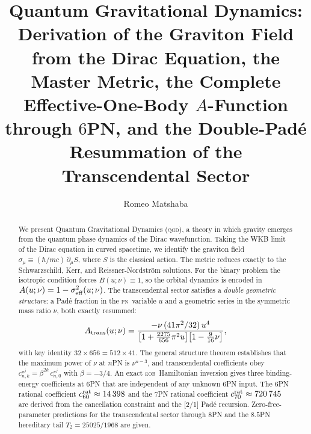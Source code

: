 \documentclass[twocolumn,aps,prd,showpacs,superscriptaddress,floatfix]{revtex4-2}
\newcommand{\sigeq}{\sigma_{\rm eff}^2}
\newcommand{\pn}[1]{$#1$PN}
\newcommand{\QGD}{\textsc{qgd}}
\newcommand{\EOB}{\textsc{eob}}
\newcommand{\PN}{\textsc{pn}}
\begin{document}
\title{Quantum Gravitational Dynamics: Derivation of the Graviton Field
from the Dirac Equation, the Master Metric, the Complete
Effective-One-Body $A$-Function through \pn{6},
and the Double-Pad\'e Resummation of the Transcendental Sector}

\author{Romeo Matshaba}

\begin{abstract}
We present Quantum Gravitational Dynamics (\QGD), a theory in which
gravity emerges from the quantum phase dynamics of the Dirac wavefunction.
Taking the WKB limit of the Dirac equation in curved spacetime, we
identify the graviton field $\sigma_\mu \equiv (\hbar/mc)\,\partial_\mu S$,
where $S$ is the classical action.
The metric reduces exactly to the Schwarzschild, Kerr,
and Reissner-Nordstr\"om solutions.
For the binary problem the isotropic condition forces
$B(u;\nu)\equiv 1$, so the orbital dynamics is encoded in
$A(u;\nu)=1-\sigeq(u;\nu)$.
The transcendental sector satisfies a \emph{double geometric structure}:
a Pad\'e fraction in the \PN\ variable $u$ and a geometric series in
the symmetric mass ratio $\nu$, both exactly resummed:
\begin{equation*}
  A_{\rm trans}(u;\nu) =
    \frac{-\nu\,(41\pi^2/32)\,u^4}
         {\bigl[1+\tfrac{2275}{656}\pi^2 u\bigr]
          \bigl[1-\tfrac{9}{16}\nu\bigr]},
\end{equation*}
with key identity $32\times656=512\times41$.
The general structure theorem establishes that the maximum power of $\nu$
at $n$PN is $\nu^{n-3}$, and transcendental coefficients obey
$c_{n,k}^{\pi^j}=\beta^{2k}\,c_{n,0}^{\pi^j}$ with $\beta=-3/4$.
An exact \EOB\ Hamiltonian inversion gives three binding-energy
coefficients at \pn{6} that are independent of any unknown 6PN input.
The 6PN rational coefficient $c_{60}^{\rm rat}\approx14\,398$ and
the 7PN rational coefficient $c_{70}^{\rm rat}\approx720\,745$ are
derived from the cancellation constraint and the [2/1] Pad\'e recursion.
Zero-free-parameter predictions for the transcendental sector through
\pn{8} and the \pn{8.5} hereditary tail $T_2=25025/1968$ are given.
\end{abstract}

\maketitle

\end{document}
